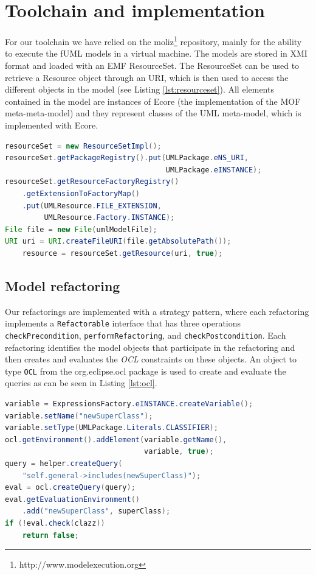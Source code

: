 \documentclass{llncs}
\begin{document}

\section{Toolchain and implementation}
\label{sec:toolchain}
For our toolchain we have relied on the moliz\footnote{http://www.modelexecution.org} repository, mainly for the ability to execute the fUML 
models in a virtual machine. The models are stored in XMI format and loaded with an EMF ResourceSet. The ResourceSet
can be used to retrieve a Resource object through an URI, which is then used to access the different objects in the model 
(see Listing \ref{lst:resourceset}). All elements contained in the model are instances of Ecore (the implementation of
the MOF meta-meta-model) and they represent classes of the UML meta-model, which is implemented with Ecore.

\begin{lstlisting}[language=Java,caption=Getting the resourceset,label=lst:resourceset]
resourceSet = new ResourceSetImpl();
resourceSet.getPackageRegistry().put(UMLPackage.eNS_URI,
                                     UMLPackage.eINSTANCE);
resourceSet.getResourceFactoryRegistry()
    .getExtensionToFactoryMap()
    .put(UMLResource.FILE_EXTENSION,
         UMLResource.Factory.INSTANCE);
File file = new File(umlModelFile);
URI uri = URI.createFileURI(file.getAbsolutePath());
    resource = resourceSet.getResource(uri, true);
\end{lstlisting}

\subsection{Model refactoring}
Our refactorings are implemented with a strategy pattern, where each refactoring implements a \texttt{Refactorable}
interface that has three operations \texttt{checkPrecondition}, \texttt{performRefactoring}, and \texttt{checkPostcondition}. 
Each refactoring identifies the model objects that participate in the refactoring and then creates and evaluates the \textit{OCL} 
constraints on these objects. An object to type \texttt{OCL} from the org.eclipse.ocl package is used to create and evaluate the 
queries as can be seen in Listing \ref{lst:ocl}.

\begin{lstlisting}[language=Java,caption=OCL validation in Java,label=lst:ocl]
variable = ExpressionsFactory.eINSTANCE.createVariable();
variable.setName("newSuperClass");
variable.setType(UMLPackage.Literals.CLASSIFIER);
ocl.getEnvironment().addElement(variable.getName(),
                                variable, true);
query = helper.createQuery(
    "self.general->includes(newSuperClass)");
eval = ocl.createQuery(query);
eval.getEvaluationEnvironment()
    .add("newSuperClass", superClass);
if (!eval.check(clazz))
    return false;
\end{lstlisting}
\end{document}
